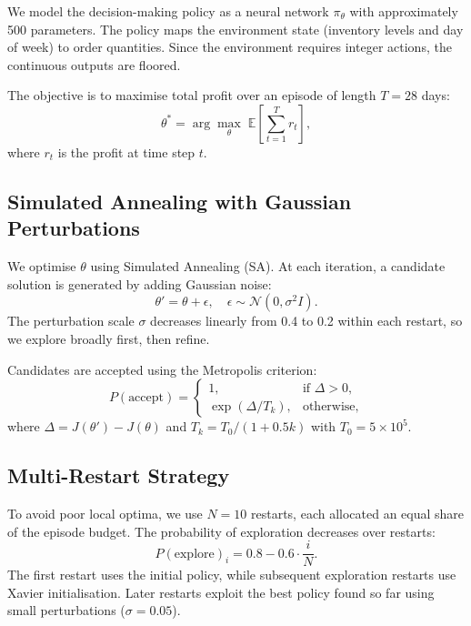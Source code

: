 \documentclass[11pt,a4paper]{article}
\begin{document}
We model the decision-making policy as a neural network $\pi_\theta$ with approximately 500 parameters. The policy maps the environment state (inventory levels and day of week) to order quantities. Since the environment requires integer actions, the continuous outputs are floored.

The objective is to maximise total profit over an episode of length $T = 28$ days:
\begin{equation}
\theta^* = \arg\max_{\theta} \; \mathbb{E}\left[\sum_{t=1}^{T} r_t \right],
\end{equation}
where $r_t$ is the profit at time step $t$.

\subsection{Simulated Annealing with Gaussian Perturbations}

We optimise $\theta$ using Simulated Annealing (SA). At each iteration, a candidate solution is generated by adding Gaussian noise:
\begin{equation}
\theta' = \theta + \epsilon, \quad \epsilon \sim \mathcal{N}(0, \sigma^2 I).
\end{equation}
The perturbation scale $\sigma$ decreases linearly from 0.4 to 0.2 within each restart, so we explore broadly first, then refine.

Candidates are accepted using the Metropolis criterion:
\begin{equation}
P(\text{accept}) =
\begin{cases}
1, & \text{if } \Delta > 0, \\
\exp(\Delta / T_k), & \text{otherwise},
\end{cases}
\end{equation}
where $\Delta = J(\theta') - J(\theta)$ and $T_k = T_0/(1 + 0.5k)$ with $T_0 = 5 \times 10^5$.

\subsection{Multi-Restart Strategy}

To avoid poor local optima, we use $N = 10$ restarts, each allocated an equal share of the episode budget. The probability of exploration decreases over restarts:
\begin{equation}
P(\text{explore})_i = 0.8 - 0.6 \cdot \frac{i}{N}.
\end{equation}
The first restart uses the initial policy, while subsequent exploration restarts use Xavier initialisation. Later restarts exploit the best policy found so far using small perturbations ($\sigma = 0.05$).
\end{document}
